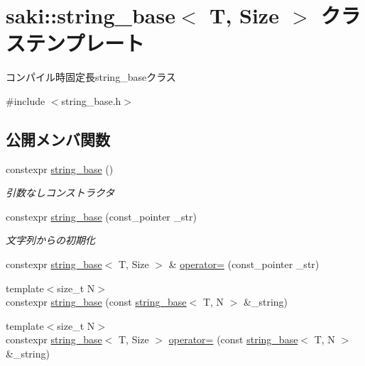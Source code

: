 \hypertarget{classsaki_1_1string__base}{}\section{saki\+:\+:string\+\_\+base$<$ T, Size $>$ クラステンプレート}
\label{classsaki_1_1string__base}


コンパイル時固定長string\+\_\+baseクラス  




{\ttfamily \#include $<$string\+\_\+base.\+h$>$}

\subsection*{公開メンバ関数}
\begin{DoxyCompactItemize}
\item 
constexpr \mbox{\hyperlink{classsaki_1_1string__base_a17d98d62506a1f6eb04f210498bcaba0}{string\+\_\+base}} ()
\begin{DoxyCompactList}\small\item\em 引数なしコンストラクタ \end{DoxyCompactList}\item 
constexpr \mbox{\hyperlink{classsaki_1_1string__base_add4f032c858fa8e9f93ab0ab810488d2}{string\+\_\+base}} (const\+\_\+pointer \+\_\+str)
\begin{DoxyCompactList}\small\item\em 文字列からの初期化 \end{DoxyCompactList}\item 
constexpr \mbox{\hyperlink{classsaki_1_1string__base}{string\+\_\+base}}$<$ T, Size $>$ \& \mbox{\hyperlink{classsaki_1_1string__base_ad6f67113019884abb525aa75f6c7d1a9}{operator=}} (const\+\_\+pointer \+\_\+str)
\item 
{\footnotesize template$<$size\+\_\+t N$>$ }\\constexpr \mbox{\hyperlink{classsaki_1_1string__base_af9c199307f7a24ecef3e770cd537a715}{string\+\_\+base}} (const \mbox{\hyperlink{classsaki_1_1string__base}{string\+\_\+base}}$<$ T, N $>$ \&\+\_\+string)
\item 
{\footnotesize template$<$size\+\_\+t N$>$ }\\constexpr \mbox{\hyperlink{classsaki_1_1string__base}{string\+\_\+base}}$<$ T, Size $>$ \mbox{\hyperlink{classsaki_1_1string__base_a44b85c70f7ed89e2e382861f3323f4d5}{operator=}} (const \mbox{\hyperlink{classsaki_1_1string__base}{string\+\_\+base}}$<$ T, N $>$ \&\+\_\+string)

\end{DoxyCompactItemize}
